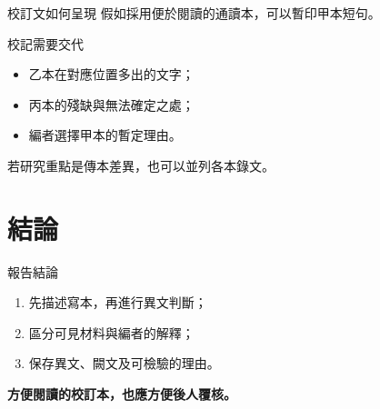 \documentclass[lang=zh]{impebeamer}
\begin{document}
\begin{frame}{校訂文如何呈現}
  假如採用便於閱讀的通讀本，可以暫印甲本短句。
  \begin{block}{校記需要交代}
    \begin{itemize}
      \item 乙本在對應位置多出的文字；
      \item 丙本的殘缺與無法確定之處；
      \item 編者選擇甲本的暫定理由。
    \end{itemize}
  \end{block}
  若研究重點是傳本差異，也可以並列各本錄文。
\end{frame}

\section{結論}
\begin{frame}{報告結論}
  \begin{enumerate}
    \item 先描述寫本，再進行異文判斷；
    \item 區分可見材料與編者的解釋；
    \item 保存異文、闕文及可檢驗的理由。
  \end{enumerate}
  \medskip
  \centering
  \textbf{方便閱讀的校訂本，也應方便後人覆核。}
\end{frame}
\end{document}
